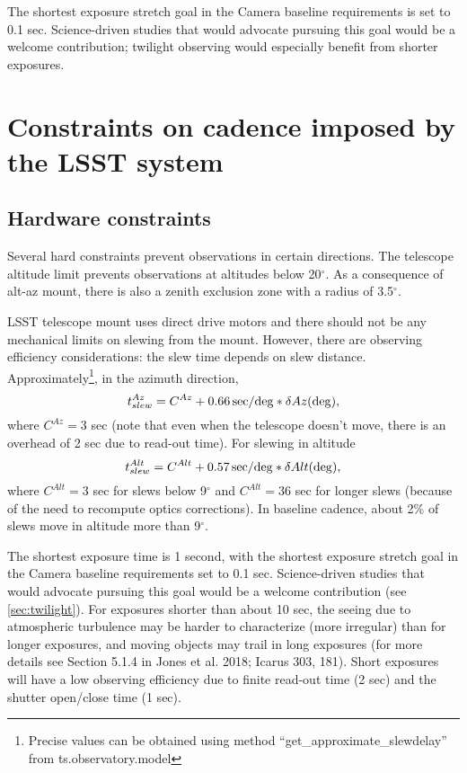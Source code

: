 \documentclass[DM,lsstdraft,toc,usenatbib]{lsstdoc}
\begin{document}
The shortest exposure stretch goal in the Camera baseline requirements is set to 0.1 sec. Science-driven
studies that would advocate pursuing this goal would be a welcome contribution; twilight observing
would especially benefit from shorter exposures. 
 

\section{Constraints on cadence imposed by the LSST system} 

\subsection{Hardware constraints}

Several hard constraints prevent observations in certain directions. The telescope altitude limit
prevents observations at altitudes below 20$^\circ$.  As a consequence of alt-az mount, there
is also a zenith exclusion zone with a radius of 3.5$^\circ$. 

LSST telescope mount uses direct drive motors and there should not be any mechanical limits 
on slewing from the mount.  However, there are observing efficiency considerations: the slew time 
depends on slew distance. Approximately\footnote{Precise values can be obtained using
method ``get\_approximate\_slewdelay'' from ts.observatory.model}, in the azimuth direction, 
\begin{equation}
             t_{slew}^{Az} = C^{Az} + 0.66 \, {\rm sec/deg} * \delta Az ({\rm deg}),  
\end{equation} 
where $C^{Az} = 3$ sec (note that even when the telescope doesn't move, there is an overhead
of 2 sec due to read-out time). For slewing in altitude
\begin{equation}
             t_{slew}^{Alt} = C^{Alt} + 0.57 \, {\rm sec/deg} * \delta Alt ({\rm deg}),  
\end{equation} 
where $C^{Alt} = 3$ sec for slews below 9$^\circ$ and $C^{Alt} = 36$ sec for longer slews (because 
of the need to recompute optics corrections). In baseline cadence, about 2\% of slews move
in altitude more than 9$^\circ$. 

The shortest exposure time is 1 second, with the shortest exposure stretch goal in the Camera 
baseline requirements set to 0.1 sec. Science-driven studies that would advocate pursuing this 
goal would be a welcome contribution (see \ref{sec:twilight}). For exposures shorter than 
about 10 sec, the seeing due to atmospheric turbulence may be harder to characterize (more
irregular) than for longer exposures, and moving objects may trail in long exposures (for more
details see Section 5.1.4 in Jones et al. 2018; Icarus 303, 181). Short exposures will have a low
observing efficiency due to finite read-out time (2 sec) and the shutter open/close time (1 sec). 
\end{document}

